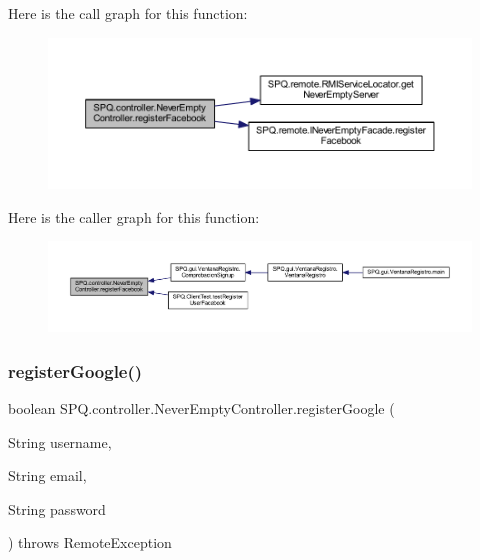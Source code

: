 Here is the call graph for this function\+:
\nopagebreak
\begin{figure}[H]
\begin{center}
\leavevmode
\includegraphics[width=350pt]{class_s_p_q_1_1controller_1_1_never_empty_controller_ad766d360d5d5c69d6e6d5b2953b27fac_cgraph}
\end{center}
\end{figure}
Here is the caller graph for this function\+:
\nopagebreak
\begin{figure}[H]
\begin{center}
\leavevmode
\includegraphics[width=350pt]{class_s_p_q_1_1controller_1_1_never_empty_controller_ad766d360d5d5c69d6e6d5b2953b27fac_icgraph}
\end{center}
\end{figure}
\mbox{\label{class_s_p_q_1_1controller_1_1_never_empty_controller_a0adc4a1885dcc8ef6fe53bd23ee2316a}} 
\subsubsection{\texorpdfstring{register\+Google()}{registerGoogle()}}
{\footnotesize\ttfamily boolean S\+P\+Q.\+controller.\+Never\+Empty\+Controller.\+register\+Google (\begin{DoxyParamCaption}\item[{String}]{username,  }\item[{String}]{email,  }\item[{String}]{password }\end{DoxyParamCaption}) throws Remote\+Exception}

